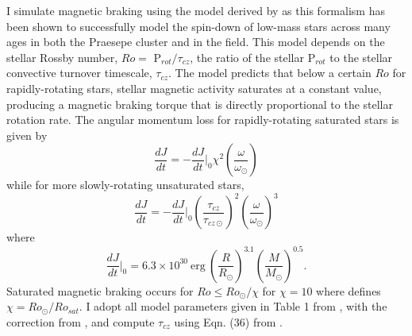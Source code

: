 I simulate magnetic braking using the model derived by \citet{Matt2015} as this formalism has been shown to successfully model the spin-down of low-mass stars across many ages in both the Praesepe cluster and in the \kepler field. This model depends on the stellar Rossby number, $Ro = $ P$_{rot}/\tau_{cz}$, the ratio of the stellar P$_{rot}$ to the stellar convective turnover timescale, $\tau_{cz}$. The \citet{Matt2015} model predicts that below a certain $Ro$ for rapidly-rotating stars, stellar magnetic activity saturates at a constant value, producing a magnetic braking torque that is directly proportional to the stellar rotation rate.  The angular momentum loss for rapidly-rotating saturated stars is given by
\begin{equation} \label{sync:eqn:mattSat}
\frac{dJ}{dt} = -\frac{dJ}{dt}\Bigg|_0 \chi^2 \left( \frac{\omega}{\omega_{\odot}} \right) 
\end{equation}
while for more slowly-rotating unsaturated stars,
\begin{equation} \label{sync:eqn:mattUnSat}
\frac{dJ}{dt} = -\frac{dJ}{dt}\Bigg|_0 \left( \frac{\tau_{cz}}{\tau_{cz \odot}} \right)^2 \left( \frac{\omega}{\omega_{\odot}} \right)^3
\end{equation}
where
\begin{equation} \label{sync:eqn:matt0}
\frac{dJ}{dt}\Bigg|_0 = 6.3 \times 10^{30} \ \mathrm{erg} \ \left( \frac{R}{R_{\odot}} \right)^{3.1} \left( \frac{M}{M_{\odot}} \right)^{0.5}.
\end{equation}
Saturated magnetic braking occurs for $Ro \leq Ro_{\odot}/\chi$ for $\chi = 10$ where \citet{Matt2015} defines $\chi = Ro_{\odot}/Ro_{sat}$.  I adopt all model parameters given in Table 1 from \citet{Matt2015}, with the correction from \citet{Matt2019}, and compute $\tau_{cz}$ using Eqn. (36) from \citet{Cranmer2011}.


